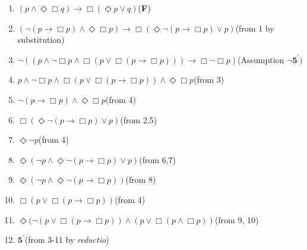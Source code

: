 \begin{enumerate}
\item{$(p\wedge \Diamond\Box q) \rightarrow \Box (\Diamond{p}\vee q)$\tab\tab\tab(\textbf{F})}
\item{$(\neg (p\rightarrow \Box p) \wedge \Diamond\Box p) \rightarrow \Box (\Diamond\neg (p\rightarrow \Box p)\vee p)$\tab(from 1 by substitution)}
\item{$\neg ((p \wedge \neg \Box p \wedge \Box (p \vee \Box (p \rightarrow \Box p))) \rightarrow \Box \neg \Box p)$\tab(Assumption $\neg \textbf{5}^\prime)$}
\item{$p \wedge \neg \Box p \wedge \Box (p \vee \Box (p \rightarrow \Box p)) \wedge \Diamond\Box p$\tab\tab(from 3)}
\item{$\neg (p\rightarrow \Box p) \wedge \Diamond\Box p$\tab\tab\tab\tab(from 4)}
\item{$\Box (\Diamond\neg (p\rightarrow \Box p)\vee p)$\tab\tab\tab\tab(from 2,5)}
\item{$\Diamond\neg p$\tab\tab\tab\tab\tab(from 4)}
\item{$\Diamond(\neg p \wedge \Diamond\neg (p\rightarrow \Box p)\vee p)$\tab\tab\tab(from 6,7)}
\item{$\Diamond(\neg p \wedge \Diamond\neg (p\rightarrow \Box p))$\tab\tab\tab(from 8)}
\item{$\Box (p \vee \Box (p \rightarrow \Box p))$\tab\tab\tab\tab(from 4)}
\item{$\Diamond(\neg (p\vee \Box (p\rightarrow \Box p)) \wedge (p\vee \Box (p\wedge \Box p))$\tab\tab(from 9, 10)}
\item{$\textbf{5}^\prime$\tab\tab\tab\tab\tab(from 3-11 by \textit{reductio})}
\end{enumerate}

